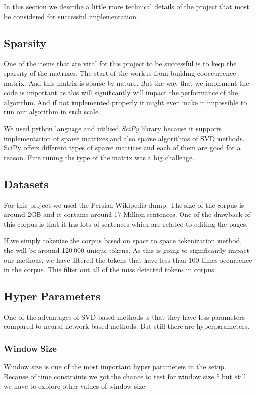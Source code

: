 In this section we describe a little more technical details of the project that most be considered for successful implementation. 
\subsection{Sparsity}
One of the items that are vital for this project to be successful is to keep the sparsity of the matrixes. The start of the work is from building cooccurrence matrix. And this matrix is sparse by nature. But the way that we implement the code is important as this will significantly will impact the performance of the algorithm. And if not implemented properly it might even make it impossible to run our algorithm in such scale. 

We used python language and utilised \textit{SciPy} library because it supports implementation of sparse matrixes and also sparse algorithms of SVD methods. SciPy offers different types of sparse matrices and each of them are good for a reason. Fine tuning the type of the matrix was a big challenge.

\subsection{Datasets}
For this project we used the Persian Wikipedia dump. The size of the corpus is around 2GB and it contains around 17 Million sentences.  One of the drawback of this corpus is that it has lots of sentences which are related to editing the pages.  

If we simply tokenize the corpus based on space to space tokenization method, the will be around 120,000 unique tokens. As this is going to significantly impact our methods, we have filtered the tokens that have less than 100 times occurrence in the corpus. This filter out all of the miss detected tokens in corpus. 



\subsection{Hyper Parameters}
One of the advantages of SVD based methods is that they have less parameters compared to neural network based methods. But still there are hyperparameters. 
\subsubsection{Window Size}
Window size is one of the most important hyper parameters in the setup.  Because of time constraints we got the chance to test for window size 5 but still we have to explore other values of window size. 

